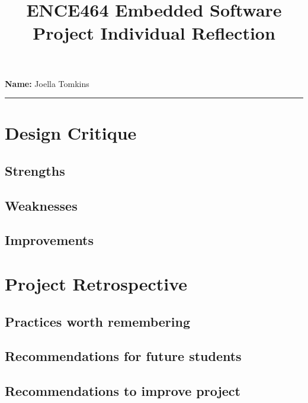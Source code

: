 \documentclass[a4paper,10pt]{article}
\title{ENCE464 Embedded Software Project Individual Reflection}
\author{}
\date{}
\begin{document}
\maketitle
\vspace{-2cm}

\noindent\textbf{Name:} Joella Tomkins

\begin{center}\rule{0.5\linewidth}{0.5pt}\end{center}

\hypertarget{design-critique}{%
\section{Design Critique}\label{design-critique}}

\hypertarget{strengths}{%
\subsection{Strengths}\label{strengths}}

\hypertarget{weaknesses}{%
\subsection{Weaknesses}\label{weaknesses}}

\hypertarget{improvements}{%
\subsection{Improvements}\label{improvements}}

\hypertarget{project-retrospective}{%
\section{Project Retrospective}\label{project-retrospective}}

\hypertarget{practices-worth-remembering}{%
\subsection{Practices worth
remembering}\label{practices-worth-remembering}}

\hypertarget{recommendations-for-future-students}{%
\subsection{Recommendations for future
students}\label{recommendations-for-future-students}}

\hypertarget{recommendations-to-improve-project}{%
\subsection{Recommendations to improve
project}\label{recommendations-to-improve-project}}
\end{document}
